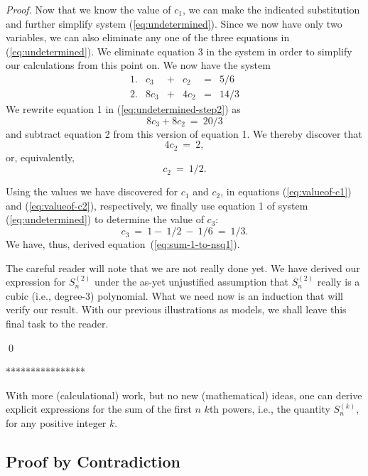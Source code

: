 {\begin{proof}
Now that we know the value of $c_1$, we can make the indicated
substitution and further simplify system (\ref{eq:undetermined}).
Since we now have only two variables, we can also eliminate any one
of the three equations in (\ref{eq:undetermined}).  We eliminate
equation 3 in the system in order to simplify our calculations from
this point on.  We now have the system
\begin{equation}
\label{eq:undetermined-step2}
\begin{array}{lccccc}
1. &
c_3  & + & c_2   & = & 5/6 \\
2. &
8c_3 & + & 4 c_2 & = & 14/3 
\end{array}
\end{equation}
We rewrite equation 1 in (\ref{eq:undetermined-step2}) as
\[ 8 c_3 + 8 c_2 \ = \ 20/3 \]
and subtract equation 2 from this version of equation 1.  We thereby
discover that
\[ 4 c_2 \ = \ 2, \]
or, equivalently,
\begin{equation}
\label{eq:valueof-c2}
c_2 \ = \ 1/2.
\end{equation}

Using the values we have discovered for $c_1$ and $c_2$, in equations
(\ref{eq:valueof-c1}) and (\ref{eq:valueof-c2}), respectively, we
finally use equation 1 of system (\ref{eq:undetermined}) to determine
the value of $c_3$:
\begin{equation}
\label{eq:valueof-c3}
c_3 \ = \ 1 - \ 1/2 \ - \ 1/6 \ = \ 1/3.
\end{equation}
We have, thus, derived equation~(\ref{eq:sum-1-to-nsq1}).

\medskip

The careful reader will note that we are not really done yet.  We
have derived our expression for $S^{(2)}_n$ under the as-yet
unjustified assumption that $S^{(2)}_n$ really is a cubic (i.e.,
degree-$3$) polynomial.  What we need now is an induction that will
verify our result.  With our previous illustrations as models, we
shall leave this final task to the reader.

\qed
\end{proof}
****************}

\bigskip

With more (calculational) work, but no new (mathematical) ideas, one can derive explicit expressions for the sum of the first $n$ $k$th powers, i.e., the quantity $S^{(k)}_n$, for any positive integer $k$.


\subsection{Proof by Contradiction}
\label{sec:Contradiction}

